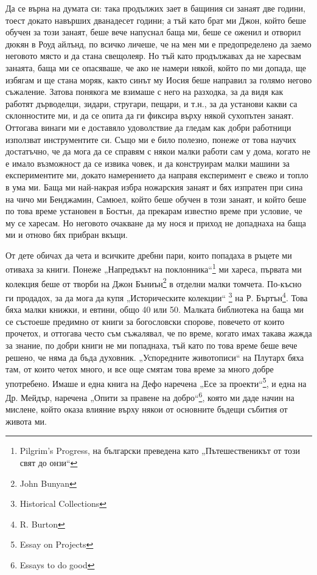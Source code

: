 \documentclass[12pt]{book}
\begin{document}
Да се върна на думата си: така продължих зает в бащиния си занаят две години, тоест докато навърших дванадесет години; а тъй като брат ми Джон, който беше обучен за този занаят, беше вече напуснал баща ми, беше се оженил и отворил дюкян в Роуд айлънд, по всичко личеше, че на мен ми е предопределено да заемо неговото място и да стана свещолеяр. Но тъй като продължавах да не харесвам занаята, баща ми се опасяваше, че ако не намери някой, който по ми допада, ще избягам и ще стана моряк, както синът му Иосия беше направил за голямо негово съжаление. Затова понякога ме взимаше с него на разходка, за да видя как работят дърводелци, зидари, стругари, пещари, и т.н., за да установи какви са склонностите ми, и да се опита да ги фиксира върху някой сухопътен занаят. Оттогава винаги ми е доставяло удоволствие да гледам как добри работници използват инструментите си. Също ми е било полезно, понеже от това научих достатъчно, че да мога да се справям с някои малки работи сам у дома, когато не е имало възможност да се извика човек, и да конструирам малки машини за експериментите ми, докато намерението да направя експеримент е свежо и топло в ума ми. Баща ми най-накрая избра ножарския занаят и бях изпратен при сина на чичо ми Бенджамин, Самюел, който беше обучен в този занаят, и който беше по това време установен в Бостън, да прекарам известно време при условие, че му се харесам. Но неговото очакване да му нося и приход не допаднаха на баща ми и отново бях прибран вкъщи.

От дете обичах да чета и всичките дребни пари, които попадаха в ръцете ми отиваха за книги. Понеже „Напредъкът на поклонника“\footnote{Pilgrim's Progress, на български преведена като „Пътешественикът от този свят до онзи“} ми хареса, първата ми колекция беше от творби на Джон Бъниън\footnote{John Bunyan} в отделни малки томчета. По-късно ги продадох, за да мога да купя „Историческите колекции“ \footnote{Historical Collections} на Р. Бъртън\footnote{R. Burton}. Това бяха малки книжки, и евтини, общо 40 или 50. Малката библиотека на баща ми се състоеше предимно от книги за богословски спорове, повечето от които прочетох, и оттогава често съм съжалявал, че по време, когато имах такава жажда за знание, по добри книги не ми попаднаха, тъй като по това време беше вече решено, че няма да бъда духовник. „Успоредните животописи“ на Плутарх бяха там, от които четох много, и все още смятам това време за много добре употребено. Имаше и една книга на Дефо наречена „Есе за проекти“\footnote{Essay on Projects}, и една на Др. Мейдър, наречена „Опити за правене на добро“\footnote{Essays to do good}, която ми даде начин на мислене, който оказа влияние върху някои от основните бъдещи събития от живота ми.
\end{document}

